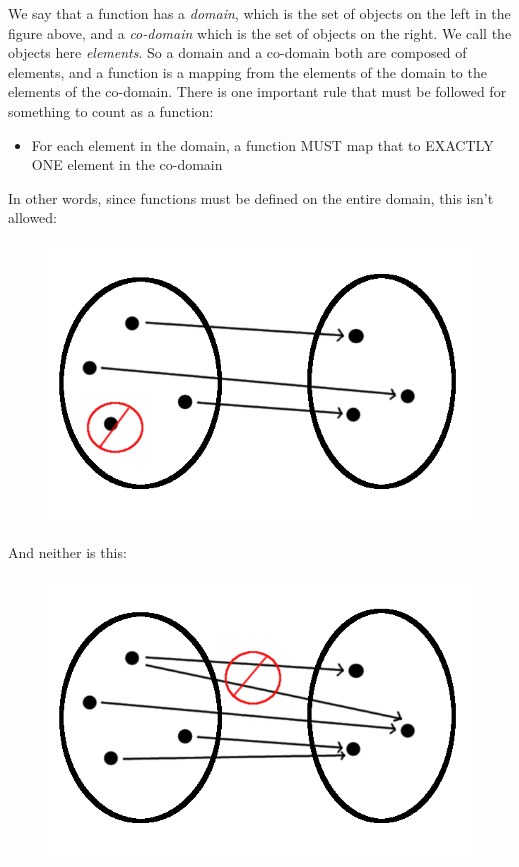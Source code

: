 \documentclass[UTF8]{book}
\begin{document}
\begin{CJK}{UTF8}{gbsn}
We say that a function has a \emph{domain}, which is the set of objects on the left in the figure above, and a \emph{co-domain} which is the set of objects on the right. We call the objects here \emph{elements}. So a domain and a co-domain both are composed of elements, and a function is a mapping from the elements of the domain to the elements of the co-domain. There is one important rule that must be followed for something to count as a function:

\begin{itemize}
\item For each element in the domain, a function MUST map that to EXACTLY ONE element in the co-domain
\end{itemize}

In other words, since functions must be defined on the entire domain, this isn't allowed:

\begin{figure}[H]
\centering
\includegraphics[width=0.8\linewidth]{function_undefined}
\end{figure}

And neither is this:

\begin{figure}[H]
\centering
\includegraphics[width=0.8\linewidth]{function_multifunction}
\end{figure}


\end{CJK}
\end{document}
